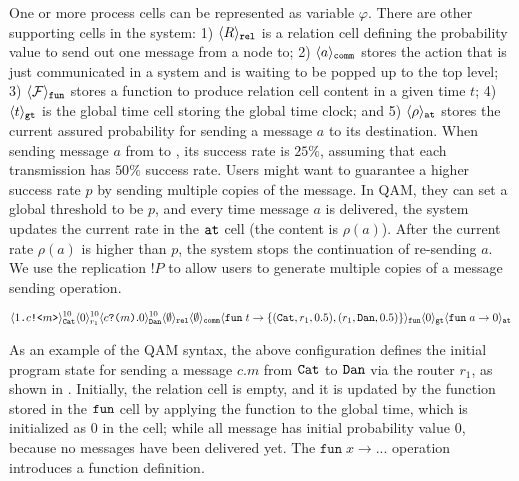 One or more process cells can be represented as variable $\varphi$.
There are other supporting cells in the system:
1) $\langle R \rangle_{\texttt{rel}}$ is a relation cell defining the probability value to send out one message from a node to;
2) $\langle a \rangle_{\texttt{comm}}$ stores the action that is just communicated in a system and is waiting to be popped up to the top level;
3) $\langle \mathcal{F} \rangle_{\texttt{fun}}$ stores a function to produce relation cell content in a given time $t$;
4) $\langle t \rangle_{\texttt{gt}}$ is the global time cell storing the global time clock;
and 5) $\langle \rho \rangle_{\texttt{at}}$ stores the current assured probability for sending a message $a$ to its destination.
When sending message $a$ from  to , its success rate is $25\%$, assuming that each transmission has $50\%$ success rate. 
Users might want to guarantee a higher success rate $p$ by sending multiple copies of the message.
In QAM, they can set a global threshold to be $p$, and every time message $a$ is delivered, 
the system updates the current rate in the $\texttt{at}$ cell (the content is $\rho(a)$).
After the current rate $\rho(a)$ is higher than $p$, the system stops the continuation of re-sending $a$.
We use the replication $!P$ to allow users to generate multiple copies of a message sending operation. 

{\footnotesize
\[
\langle 1\texttt{.}c\texttt{!<}m\texttt{>} \rangle^{10}_{\texttt{Cat}}\langle 0 \rangle^{10}_{r_1}
\langle c\texttt{?(}m\texttt{)}.0 \rangle^{10}_{\texttt{Dan}} 
\langle \emptyset \rangle_{\texttt{rel}}
\langle \emptyset \rangle_{\texttt{comm}}
\langle \texttt{fun}\;t\to\{(\texttt{Cat},r_1,0.5), (r_1,\texttt{Dan},0.5)\} \rangle_{\texttt{fun}}
\langle 0 \rangle_{\texttt{gt}}
\langle \texttt{fun}\;a\to 0 \rangle_{\texttt{at}}
\]
}

As an example of the QAM syntax, the above configuration defines the initial program state for sending a message $c.m$ from $\texttt{Cat}$ to $\texttt{Dan}$ via the router $r_1$, as shown in . Initially, the relation cell is empty, and it is updated by the function stored in the $\texttt{fun}$ cell by applying the function to the global time, which is initialized as $0$ in the  cell;
while all message has initial probability value $0$, because no messages have been delivered yet.
The $\texttt{fun}\;x\to ...$ operation introduces a function definition.

